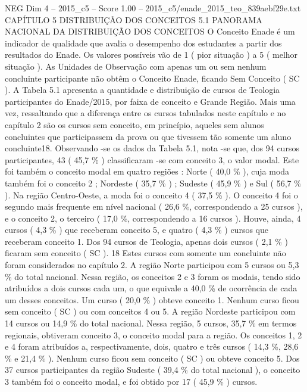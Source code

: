\begin{textsample}{NEG Dim 4 – 2015\_c5 – Score 1.00 – 2015\_c5/enade\_2015\_teo\_839aebf29e.txt}  \label{ex:f4_neg_187}
CAPÍTULO 5 DISTRIBUIÇÃO DOS CONCEITOS 5.1 PANORAMA NACIONAL DA DISTRIBUIÇÃO DOS CONCEITOS O Conceito Enade é um indicador de qualidade que avalia o desempenho dos estudantes a partir dos resultados do Enade.
Os valores possíveis vão de 1 ( pior situação ) a 5 ( melhor situação ).
As Unidades de Observação com apenas um ou sem nenhum concluinte participante não obtêm o Conceito Enade, ficando Sem Conceito ( SC ).
A Tabela 5.1 apresenta a quantidade e distribuição de cursos de Teologia participantes do Enade/2015, por faixa de conceito e Grande Região.
Mais uma vez, ressaltando que a diferença entre os cursos tabulados neste capítulo e no capítulo 2 são os cursos sem conceito, em princípio, aqueles sem alunos concluintes que participassem da prova ou que tivessem tão somente um aluno concluinte18.
Observando -se os dados da Tabela 5.1, nota -se que, dos 94 cursos participantes, 43 ( 45,7 \% ) classificaram -se com conceito 3, o valor modal.
Este foi também o conceito modal em quatro regiões : Norte ( 40,0 \% ), cuja moda também foi o conceito 2 ; Nordeste ( 35,7 \% ) ; Sudeste ( 45,9 \% ) e Sul ( 56,7 \% ).
Na região Centro-Oeste, a moda foi o conceito 4 ( 37,5 \% ).
O conceito 4 foi o segundo mais frequente em nível nacional ( 26,6 \%, correspondendo a 25 cursos ), e o conceito 2, o terceiro ( 17,0 \%, correspondendo a 16 cursos ).
Houve, ainda, 4 cursos ( 4,3 \% ) que receberam conceito 5, e quatro ( 4,3 \% ) cursos que receberam conceito 1.
Dos 94 cursos de Teologia, apenas dois cursos ( 2,1 \% ) ficaram sem conceito ( SC ). 18 Estes cursos com somente um concluinte não foram considerados no capítulo 2.
A região Norte participou com 5 cursos ou 5,3 \% do total nacional.
Nessa região, os conceitos 2 e 3 foram os modais, tendo sido atribuídos a dois cursos cada um, o que equivale a 40,0 \% de ocorrência de cada um desses conceitos.
Um curso ( 20,0 \% ) obteve conceito 1.
Nenhum curso ficou sem conceito ( SC ) ou com conceitos 4 ou 5.
A região Nordeste participou com 14 cursos ou 14,9 \% do total nacional.
Nessa região, 5 cursos, 35,7 \% em termos regionais, obtiveram conceito 3, o conceito modal para a região.
Os conceitos 1, 2 e 4 foram atribuídos a, respectivamente, dois, quatro e três cursos ( 14,3 \%, 28,6 \% e 21,4 \% ).
Nenhum curso ficou sem conceito ( SC ) ou obteve conceito 5.
Dos 37 cursos participantes da região Sudeste ( 39,4 \% do total nacional ), o conceito 3 também foi o conceito modal, e foi obtido por 17 ( 45,9 \% ) cursos.

\end{textsample}
